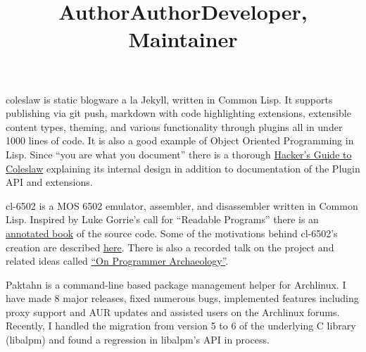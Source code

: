 \documentclass[margintitle,line]{res}
\begin{document}
\begin{resume}
\title{Author}
\begin{position}
  coleslaw is static blogware a la Jekyll, written in Common Lisp. It
  supports publishing via git push, markdown with code highlighting extensions,
  extensible content types, theming, and various functionality through plugins
  all in under 1000 lines of code. It is also a good example of Object Oriented
  Programming in Lisp. Since ``you are what you document'' there is a thorough
  \href{https://github.com/kingcons/coleslaw/blob/master/docs/hacking.md}{Hacker's Guide to Coleslaw}
  explaining its internal design in addition to documentation of the Plugin API
  and extensions.
\end{position}

\title{Author}
\begin{position}
  cl-6502 is a MOS 6502 emulator, assembler, and disassembler written in
  Common Lisp. Inspired by Luke Gorrie's call for ``Readable Programs'' there
  is an \href{http://redlinernotes.com/docs/cl-6502.pdf}{annotated book} of the
  source code.  Some of the motivations behind cl-6502's creation are described
  \href{http://blog.kingcons.io/posts/Towards-Comprehensible-Computing.html}{here}.
  There is also a recorded talk on the project and related ideas called
  \href{http://vimeo.com/redline6561/on-programmer-archaeology}{``On Programmer Archaeology''}.
\end{position}

\title{Developer, Maintainer}
\begin{position}
  Paktahn is a command-line based package management helper for Archlinux.
  I have made 8 major releases, fixed numerous bugs, implemented features
  including proxy support and AUR updates and assisted users on the Archlinux
  forums. Recently, I handled the migration from version 5 to 6 of the
  underlying C library (libalpm) and found a regression in libalpm's API in
  process.
\end{position}

\pagebreak


\end{resume}
\end{document}
